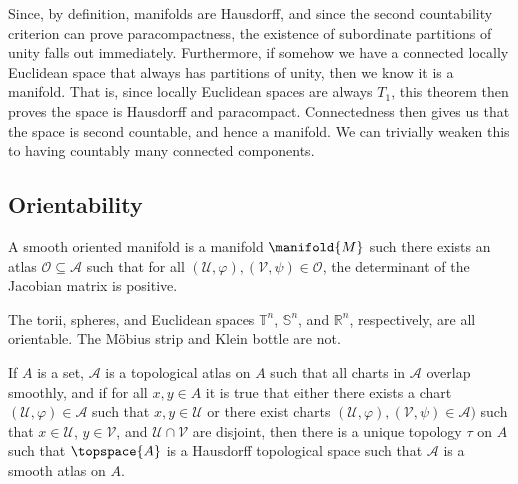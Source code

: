 \documentclass{article}                                                        %
\begin{document}
            Since, by definition, manifolds are Hausdorff, and since the second
            countability criterion can prove paracompactness, the existence of
            subordinate partitions of unity falls out immediately. Furthermore,
            if somehow we have a connected locally Euclidean space that always
            has partitions of unity, then we know it is a manifold. That is,
            since locally Euclidean spaces are always $T_{1}$, this theorem then
            proves the space is Hausdorff and paracompact. Connectedness then
            gives us that the space is second countable, and hence a manifold.
            We can trivially weaken this to having countably many connected
            components.
        \subsection{Orientability}
            \begin{definition}
                A smooth oriented manifold is a manifold $\manifold{M}$ such
                there exists an atlas $\mathcal{O}\subseteq\mathcal{A}$ such
                that for all
                $(\mathcal{U},\varphi),(\mathcal{V},\psi)\in\mathcal{O}$, the
                determinant of the Jacobian matrix is positive.
            \end{definition}
            \begin{example}
                The torii, spheres, and Euclidean spaces $\mathbb{T}^{n}$,
                $\mathbb{S}^{n}$, and $\mathbb{R}^{n}$, respectively, are all
                orientable. The M\"{o}bius strip and Klein bottle are not.
            \end{example}
            \begin{theorem}
                If $A$ is a set, $\mathcal{A}$ is a topological atlas on $A$
                such that all charts in $\mathcal{A}$ overlap smoothly, and if
                for all $x,y\in{A}$ it is true that either there exists a chart
                $(\mathcal{U},\varphi)\in\mathcal{A}$ such that
                $x,y\in\mathcal{U}$ or there exist charts
                $(\mathcal{U},\varphi),(\mathcal{V},\psi)\in\mathcal{A})$ such
                that $x\in\mathcal{U}$, $y\in\mathcal{V}$, and
                $\mathcal{U}\cap\mathcal{V}$ are disjoint, then there is a
                unique topology $\tau$ on $A$ such that $\topspace{A}$ is
                a Hausdorff topological space such that $\mathcal{A}$ is a
                smooth atlas on $A$.
            \end{theorem}
\end{document}
